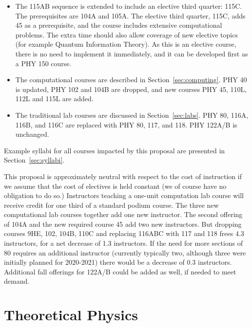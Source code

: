 \documentclass[12pt]{article}
\begin{document}
\begin{itemize}
\item The 115AB sequence is extended to include an elective third
  quarter: 115C.  The prerequisites are 104A and 105A.  The elective
  third quarter, 115C, adds 45 as a prerequisite, and the course
  includes extensive computational problems.  The extra time should
  also allow coverage of new elective topics (for example Quantum
  Information Theory).  As this is an elective course, there is no
  need to implement it immediately, and it can be developed first as a
  PHY 150 course.

\item The computational courses are described in
  Section~\ref{sec:computing}. PHY 40 is updated, PHY 102 and 104B are
  dropped, and new courses PHY 45, 110L, 112L and 115L are added.

\item The traditional lab courses are discussed in
  Section~\ref{sec:labs}. PHY 80, 116A, 116B, and 116C are replaced with
  PHY 80, 117, and 118.  PHY 122A/B is unchanged.
  
\end{itemize}
Example syllabi for all courses impacted by this proposal are
presented in Section~\ref{sec:syllabi}.

This proposal is approximately neutral with respect to the cost of
instruction if we assume that the cost of electives is held constant
(we of course have no obligation to do so.)  Instructors teaching a
one-unit computation lab course will receive credit for one third of a
standard podium course.  The three new computational lab courses
together add one new instructor.  The second offering of 104A and the
new required course 45 add two new instructors.  But dropping courses
9HE, 102, 104B, 110C and replacing 116ABC with 117 and 118 frees 4.3
instructors, for a net decrease of 1.3 instructors.  If the need for
more sections of 80 requires an additional instructor (currently
typically two, although three were initially planned for 2020-2021)
there would be a decrease of 0.3 instructors.  Additional fall
offerings for 122A/B could be added as well, if needed to meet demand.

\section{Theoretical Physics}
\label{sec:theory}
\end{document}
